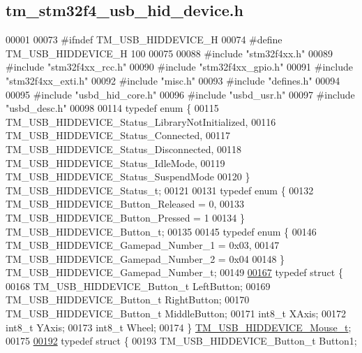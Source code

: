 \hypertarget{tm__stm32f4__usb__hid__device_8h_source}{}\subsection{tm\+\_\+stm32f4\+\_\+usb\+\_\+hid\+\_\+device.\+h}

\begin{DoxyCode}
00001 
00073 \textcolor{preprocessor}{#ifndef TM\_USB\_HIDDEVICE\_H}
00074 \textcolor{preprocessor}{#define TM\_USB\_HIDDEVICE\_H 100}
00075 
00088 \textcolor{preprocessor}{#include "stm32f4xx.h"}
00089 \textcolor{preprocessor}{#include "stm32f4xx\_rcc.h"}
00090 \textcolor{preprocessor}{#include "stm32f4xx\_gpio.h"}
00091 \textcolor{preprocessor}{#include "stm32f4xx\_exti.h"}
00092 \textcolor{preprocessor}{#include "misc.h"}
00093 \textcolor{preprocessor}{#include "defines.h"}
00094 
00095 \textcolor{preprocessor}{#include  "usbd\_hid\_core.h"}
00096 \textcolor{preprocessor}{#include  "usbd\_usr.h"}
00097 \textcolor{preprocessor}{#include  "usbd\_desc.h"}
00098 
00114 \textcolor{keyword}{typedef} \textcolor{keyword}{enum} \{
00115     TM\_USB\_HIDDEVICE\_Status\_LibraryNotInitialized,
00116     TM\_USB\_HIDDEVICE\_Status\_Connected,
00117     TM\_USB\_HIDDEVICE\_Status\_Disconnected,
00118     TM\_USB\_HIDDEVICE\_Status\_IdleMode,
00119     TM\_USB\_HIDDEVICE\_Status\_SuspendMode
00120 \} TM\_USB\_HIDDEVICE\_Status\_t;
00121 
00131 \textcolor{keyword}{typedef} \textcolor{keyword}{enum} \{
00132     TM\_USB\_HIDDEVICE\_Button\_Released = 0,
00133     TM\_USB\_HIDDEVICE\_Button\_Pressed = 1
00134 \} TM\_USB\_HIDDEVICE\_Button\_t;
00135 
00145 \textcolor{keyword}{typedef} \textcolor{keyword}{enum} \{
00146     TM\_USB\_HIDDEVICE\_Gamepad\_Number\_1 = 0x03,
00147     TM\_USB\_HIDDEVICE\_Gamepad\_Number\_2 = 0x04
00148 \} TM\_USB\_HIDDEVICE\_Gamepad\_Number\_t;
00149 
\hypertarget{tm__stm32f4__usb__hid__device_8h_source_l00167}{}\hyperlink{struct_t_m___u_s_b___h_i_d_d_e_v_i_c_e___mouse__t}{00167} \textcolor{keyword}{typedef} \textcolor{keyword}{struct }\{
00168     TM\_USB\_HIDDEVICE\_Button\_t LeftButton;
00169     TM\_USB\_HIDDEVICE\_Button\_t RightButton;
00170     TM\_USB\_HIDDEVICE\_Button\_t MiddleButton;
00171     int8\_t XAxis;
00172     int8\_t YAxis;
00173     int8\_t Wheel;
00174 \} \hyperlink{struct_t_m___u_s_b___h_i_d_d_e_v_i_c_e___mouse__t}{TM\_USB\_HIDDEVICE\_Mouse\_t};
00175 
\hypertarget{tm__stm32f4__usb__hid__device_8h_source_l00192}{}\hyperlink{struct_t_m___u_s_b___h_i_d_d_e_v_i_c_e___gamepad__t}{00192} \textcolor{keyword}{typedef} \textcolor{keyword}{struct }\{
00193     TM\_USB\_HIDDEVICE\_Button\_t Button1;

\end{DoxyCode}

